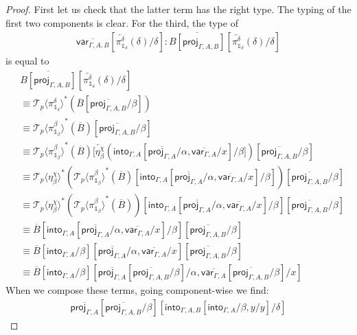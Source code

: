 \documentclass[10pt]{article}
\theoremstyle{definition}
\newcommand{\rewrite}[2]{\overleftarrow{#1}(#2)}
\newcommand\St[2]{\ensuremath{{#1}^*(#2)}}
\newcommand\ApEl[2]{\mathcal{T}_{#1}\langle#2\rangle}
\newcommand{\upstairs}[1]{\overline{#1}}
\newcommand\proj[1]{\ensuremath{\mathsf{proj}_{#1}}}
\newcommand\qvar[1]{\ensuremath{\mathsf{var}_{#1}}}
\newcommand\into[1]{\ensuremath{\mathsf{into}_{#1}}}
\newcommand\One{\ensuremath{\mathds{1}}}
\begin{document}
\begin{proof}
First let us check that the latter term has the right type. The typing of the first two components is clear. For the third, the type of 
\begin{align*}
\upstairs{\qvar{\Gamma, A, B}}[\rewrite{\pi^\delta_{\One_\delta}}{\delta}/\delta] : \upstairs{B[\proj{\Gamma, A, B}]}[\rewrite{\pi^\delta_{\One_\delta}}{\delta}/\delta]
\end{align*}
is equal to
\begin{align*}
&\upstairs{B[\proj{\Gamma, A, B}]}[\rewrite{\pi^\delta_{\One_\delta}}{\delta}/\delta] \\
&\equiv \St{\ApEl{p}{\pi^\delta_{\One_\delta}}}{\upstairs{B}[\upstairs{\proj{\Gamma, A, B}}/\beta]} \\
&\equiv \St{\ApEl{p}{\pi^\beta_{\One_\beta}}}{\upstairs{B}}[\upstairs{\proj{\Gamma, A, B}}/\beta] \\
&\equiv \St{\ApEl{p}{\pi^\beta_{\One_\beta}}}{\upstairs{B}}[\rewrite{\eta^\chi_\beta}{\into{\Gamma, A}[\upstairs{\proj{\Gamma, A}}/\alpha, \upstairs{\qvar{\Gamma, A}}/x]/\beta]}[\upstairs{\proj{\Gamma, A, B}}/\beta] \\
&\equiv \St{\ApEl{p}{\eta^\chi_\beta}}{\St{\ApEl{p}{\pi^\beta_{\One_\beta}}}{\upstairs{B}}[\into{\Gamma, A}[\upstairs{\proj{\Gamma, A}}/\alpha, \upstairs{\qvar{\Gamma, A}}/x]/\beta]}[\upstairs{\proj{\Gamma, A, B}}/\beta] \\
&\equiv \St{\ApEl{p}{\eta^\chi_\beta}}{\St{\ApEl{p}{\pi^\beta_{\One_\beta}}}{\upstairs{B}}}[\into{\Gamma, A}[\upstairs{\proj{\Gamma, A}}/\alpha, \upstairs{\qvar{\Gamma, A}}/x]/\beta][\upstairs{\proj{\Gamma, A, B}}/\beta] \\
&\equiv \upstairs{B}[\into{\Gamma, A}[\upstairs{\proj{\Gamma, A}}/\alpha, \upstairs{\qvar{\Gamma, A}}/x]/\beta][\upstairs{\proj{\Gamma, A, B}}/\beta] \\
&\equiv \upstairs{B}[\into{\Gamma, A}/\beta][\upstairs{\proj{\Gamma, A}}/\alpha, \upstairs{\qvar{\Gamma, A}}/x][\upstairs{\proj{\Gamma, A, B}}/\beta] \\
&\equiv \upstairs{B}[\into{\Gamma, A}/\beta][\upstairs{\proj{\Gamma, A}}[\upstairs{\proj{\Gamma, A, B}}/\beta]/\alpha, \upstairs{\qvar{\Gamma, A}}[\upstairs{\proj{\Gamma, A, B}}/\beta]/x]
\end{align*}
When we compose these terms, going component-wise we find:
\begin{align*}
\upstairs{\proj{\Gamma, A}}[\upstairs{\proj{\Gamma, A, B}}/\beta][\into{\Gamma, A, B}[\into{\Gamma, A}/\beta, y/y]/\delta] 

\end{align*}
\end{proof}
\end{document}
